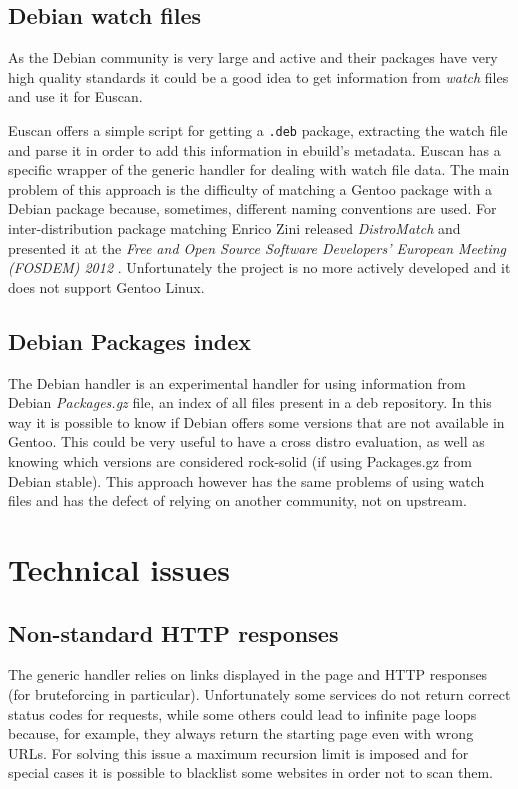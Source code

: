 \subsection{Debian watch files}
As the Debian community is very large and active and their packages have very high quality standards it could be a good idea to get information from \emph{watch} files and use it for Euscan.

Euscan offers a simple script for getting a \texttt{.deb} package, extracting the watch file and parse it in order to add this information in ebuild's metadata.
Euscan has a specific wrapper of the generic handler for dealing with watch file data.
The main problem of this approach is the difficulty of matching a Gentoo package with a Debian package because, sometimes, different naming conventions are used. For inter-distribution package matching Enrico Zini released \emph{DistroMatch} \cite{distromatch} and presented it at the \emph{Free and Open Source Software Developers' European Meeting (FOSDEM) 2012} \cite{distromatch_fosdem}. Unfortunately the project is no more actively developed \cite{distromatch_away} and it does not support Gentoo Linux.


\subsection{Debian Packages index}
The Debian handler is an experimental handler for using information from Debian \emph{Packages.gz} file, an index of all files present in a deb repository. In this way it is possible to know if Debian offers some versions that are not available in Gentoo. This could be very useful to have a cross distro evaluation, as well as knowing which versions are considered rock-solid (if using Packages.gz from Debian stable).
This approach however has the same problems of using watch files and has the defect of relying on another community, not on upstream.

\section{Technical issues}
\subsection{Non-standard HTTP responses}
The generic handler relies on links displayed in the page and HTTP responses (for bruteforcing in particular). Unfortunately some services do not return correct status codes for requests, while some others could lead to infinite page loops because, for example, they always return the starting page even with wrong URLs.
For solving this issue a maximum recursion limit is imposed and for special cases it is possible to blacklist some websites in order not to scan them.

